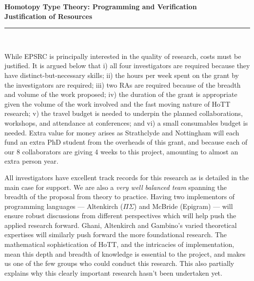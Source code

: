 \documentclass[a4paper,11pt]{article}
\begin{document}
\thispagestyle{plain}
\begin{center}
  {\Large \bf Homotopy Type Theory: Programming and Verification\\
\vspace{0.2in}
  Justification of Resources}\\[1ex]

\vspace*{-0.1in}

\rule{160mm}{.5mm}\\[2ex]
\end{center}

\noindent While EPSRC is principally interested in the quality of
research, costs must be justified. It is argued below that i) all four
investigators are required because they have
distinct-but-necessary skills; ii) the hours per week spent on
the grant by the investigators are required; iii)  two RAs are required because of the
breadth and volume of the work proposed; iv) the duration of the
grant is appropriate given the volume of the work involved and the
fast moving nature of HoTT research; v) the travel budget
is needed to underpin the planned collaborations, workshops, and
attendance at conferences; and vi) a small consumables budget is
needed. Extra value for money arises
as Strathclyde and Nottingham 
will each fund an extra PhD student from the overheads of this grant, and
because each of our 8 collaborators are giving 4 weeks  to
this project, amounting to almost an extra person year.

\vspace{0.02in}

All investigators have excellent track records for this research as is
detailed in the main case for support.  We are also a {\em very well
  balanced team} spanning the breadth of the proposal from theory to
practice. Having two implementors of programming languages ---
Altenkirch ($\Pi\Sigma$) and McBride (Epigram) --- will ensure robust
discussions from different perspectives which will help push the
applied research forward. Ghani, Altenkirch and Gambino's varied
theoretical expertises will similarly push forward the more
foundational research. The mathematical sophistication of HoTT, and
the intricacies of implementation, mean this depth and breadth of
knowledge is essential to the project, and makes us one of the few groups
who could conduct this research. This also partially explains why this
clearly important research hasn't been undertaken yet.
\end{document}
